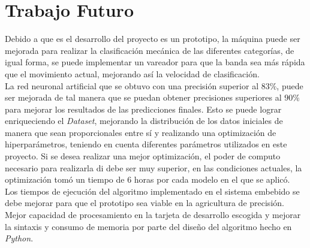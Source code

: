 	\chapter{Trabajo Futuro}

	Debido a que es el desarrollo del proyecto es un prototipo, la máquina puede ser mejorada para realizar la clasificación mecánica de las diferentes categorías, de igual forma, se puede implementar un vareador para que la banda sea más rápida que el movimiento actual, mejorando así la velocidad de clasificación.\\
	
	La red neuronal artificial que se obtuvo con una precisión superior al $83\%$, puede ser mejorada de tal manera que se puedan obtener precisiones superiores al $90\%$ para mejorar los resultados de las predicciones finales. Esto se puede lograr enriqueciendo el \textit{Dataset}, mejorando la distribución de los datos iniciales de manera que sean proporcionales entre sí y realizando una optimización de hiperparámetros, teniendo en cuenta diferentes parámetros utilizados en este proyecto. Si se desea realizar una mejor optimización, el poder de computo necesario para realizarla di debe ser muy superior, en las condiciones actuales, la optimización tomó un tiempo de $6$ horas por cada modelo en el que se aplicó.\\
	
	Los tiempos de ejecución del algoritmo implementado en el sistema embebido se debe mejorar para que el prototipo sea viable en la agricultura de precisión. Mejor capacidad de procesamiento en la tarjeta de desarrollo escogida y mejorar la sintaxis y consumo de memoria por parte del diseño del algoritmo hecho en \textit{Python}.
	
	
	
	
	





